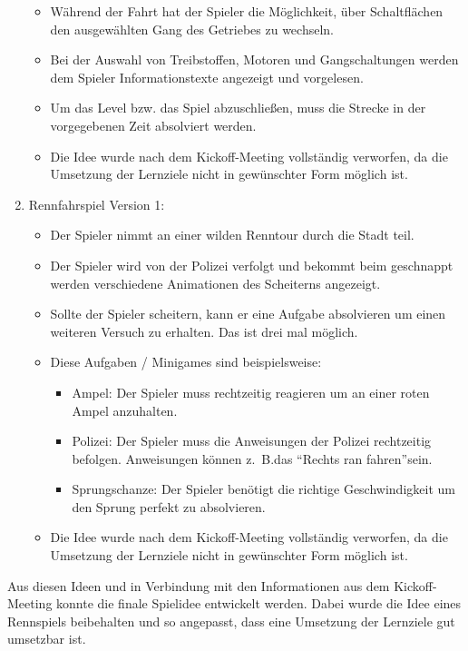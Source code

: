 \begin{enumerate}
\begin{itemize}
			\item{Während der Fahrt hat der Spieler die Möglichkeit, über Schaltflächen den ausgewählten Gang des Getriebes zu wechseln.}
			\item{Bei der Auswahl von Treibstoffen, Motoren und Gangschaltungen werden dem Spieler Informationstexte angezeigt und vorgelesen.}
			\item{Um das Level bzw. das Spiel abzuschließen, muss die Strecke in der vorgegebenen Zeit absolviert werden.}
			\item{Die Idee wurde nach dem Kickoff-Meeting vollständig verworfen, da die Umsetzung der Lernziele nicht in gewünschter Form möglich ist.}
		\end{itemize}
		\item{Rennfahrspiel Version 1:}
		\begin{itemize}
			\item{Der Spieler nimmt an einer wilden Renntour durch die Stadt teil.}
			\item{Der Spieler wird von der Polizei verfolgt und bekommt beim geschnappt werden verschiedene Animationen des Scheiterns angezeigt.}
			\item{Sollte der Spieler scheitern, kann er eine Aufgabe absolvieren um einen weiteren Versuch zu erhalten. Das ist drei mal möglich.}
			\item{Diese Aufgaben / Minigames sind beispielsweise:}
			\begin{itemize}
				\item{Ampel: Der Spieler muss rechtzeitig reagieren um an einer roten Ampel anzuhalten.}
				\item{Polizei: Der Spieler muss die Anweisungen der Polizei rechtzeitig befolgen. Anweisungen können z.~B.\@ das \enquote{Rechts ran fahren}sein.}
				\item{Sprungschanze: Der Spieler benötigt die richtige Geschwindigkeit um den Sprung perfekt zu absolvieren.}
			\end{itemize}
			\item{Die Idee wurde nach dem Kickoff-Meeting vollständig verworfen, da die Umsetzung der Lernziele nicht in gewünschter Form möglich ist.}
		\end{itemize}
	\end{enumerate}
	Aus diesen Ideen und in Verbindung mit den Informationen aus dem Kickoff-Meeting konnte die finale Spielidee entwickelt werden. Dabei wurde die Idee eines Rennspiels beibehalten und so angepasst, dass eine Umsetzung der Lernziele gut umsetzbar ist.
